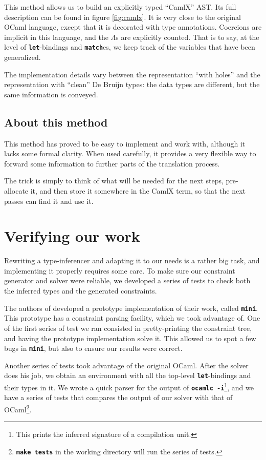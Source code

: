 \documentclass[10pt,a4paper,twoside,titlepage,twocolumn]{article}
\newcommand{\code}[1]{\textbf{\texttt{#1}}}
\begin{document}
This method allows us to build an explicitly typed ``CamlX'' AST. Its full
description can be found in figure \vref{fig:camlx}. It is very close to the
original OCaml language, except that it is decorated with type annotations.
Coercions are implicit in this language, and the $\Lambda$s are explicitly
counted. That is to say, at the level of \code{let}-bindings and \code{match}es,
we keep track of the variables that have been generalized.

The implementation details vary between the representation ``with holes'' and
the representation with ``clean'' De Bruijn types: the data types are different,
but the same information is conveyed.

\subsection{About this method}

This method has proved to be easy to implement and work with, although it lacks
some formal clarity. When used carefully, it provides a very flexible way to
forward some information to further parts of the translation process.

The trick is simply to think of what will be needed for the next steps,
pre-allocate it, and then store it somewhere in the CamlX term, so
that the next passes can find it and use it.

\section{Verifying our work}

Rewriting a type-inferencer and adapting it to our needs is a rather big task, and
implementing it properly requires some care. To make sure our constraint
generator and solver were reliable, we developed a series of tests to check both
the inferred types and the generated constraints.

The authors of \cite{pottier2005essence} developed a prototype implementation of
their work, called \code{mini}. This prototype has a constraint parsing
facility, which we took advantage of. One of the first series of test we ran
consisted in pretty-printing the constraint tree, and having the prototype
implementation solve it. This allowed us to spot a few bugs in \code{mini}, but
also to ensure our results were correct.

Another series of tests took advantage of the original OCaml. After the solver
does his job, we obtain an environment with all the top-level
\code{let}-bindings and their types in it. We wrote a quick parser for the
output of \code{ocamlc -i}\footnote{This prints the inferred signature of a
compilation unit.}, and we have a series of tests that compares the output of
our solver with that of OCaml\footnote{\code{make tests} in the working
directory will run the series of tests.}.
\end{document}
